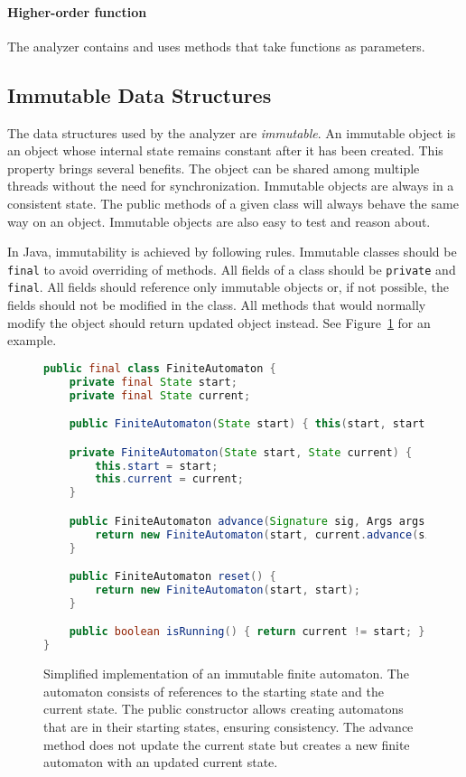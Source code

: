 \paragraph{Higher-order function}
The analyzer contains and uses methods that take functions as parameters.

\subsection{Immutable Data Structures}

The data structures used by the analyzer are \emph{immutable}. An immutable
object is an object whose internal state remains constant after it has been
created.  This property brings several benefits. The object can be shared among
multiple threads without the need for synchronization. Immutable objects are
always in a consistent state. The public methods of a given class will always
behave the same way on an object. Immutable objects are also easy to test and
reason about.

In Java, immutability is achieved by following rules. Immutable classes should
be \texttt{final} to avoid overriding of methods. All fields of a class
should be \texttt{private} and \texttt{final}. All fields should reference only
immutable objects or, if not possible, the fields should not be modified in the
class. All methods that would normally modify the object should return updated
object instead. See Figure~\ref{immutable} for an example.

\begin{figure}[hbt]
    \label{immutable}
    \begin{lstlisting}[language=java]
public final class FiniteAutomaton {
    private final State start;
    private final State current;

    public FiniteAutomaton(State start) { this(start, start); }

    private FiniteAutomaton(State start, State current) {
        this.start = start;
        this.current = current;
    }

    public FiniteAutomaton advance(Signature sig, Args args) {
        return new FiniteAutomaton(start, current.advance(sig, args));
    }

    public FiniteAutomaton reset() {
        return new FiniteAutomaton(start, start);
    }

    public boolean isRunning() { return current != start; }
}
\end{lstlisting}
    \caption{Simplified implementation of an immutable finite automaton. The
    automaton consists of references to the starting state and the current
    state. The public constructor allows creating automatons that are in their
    starting states, ensuring consistency. The advance method does not update
    the current state but creates a new finite automaton with an updated current
    state.}
\end{figure}

